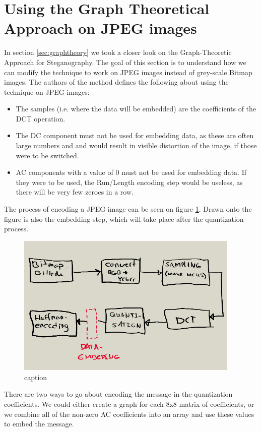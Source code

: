 \section{Using the Graph Theoretical Approach on JPEG images}
In section \ref{sec:graphtheory} we took a closer look on the Graph-Theoretic Approach for Steganography. The goal of this section is to understand how we can modify the technique to work on JPEG images instead of grey-scale Bitmap images. The authors of the method defines the following about using the technique on JPEG images\cite{hetzl_2005}:

\begin{itemize}
	\item The samples (i.e. where the data will be embedded) are the coefficients of the DCT operation. 
	\item The DC component must not be used for embedding data, as these are often large numbers and and would result in visible distortion of the image, if those were to be switched.
	\item AC components with a value of 0 must not be used for embedding data. If they were to be used, the Run/Length encoding step would be useless, as there will be very few zeroes in a row.
\end{itemize}

The process of encoding a JPEG image can be seen on figure \ref{fig:JPEGprocess}. Drawn onto the figure is also the embedding step, which will take place after the quantization process.

\begin{figure}[h!]
	\centering
	\includegraphics[width=0.95\textwidth]{figures/JPEGprocess.png}
	\caption{caption}
	\label{fig:JPEGprocess}
\end{figure}

There are two ways to go about encoding the message in the quantization coefficients. We could either create a graph for each 8x8 matrix of coefficients, or we combine all of the non-zero AC coefficients into an array and use these values to embed the message.
